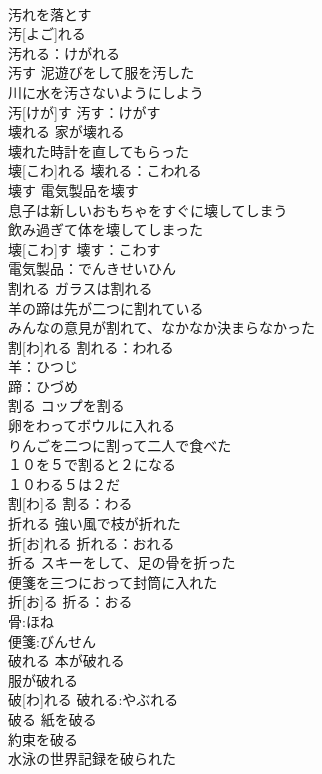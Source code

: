 \documentclass[8pt]{extreport}
\begin{document}
\begin{CJK}{UTF8}{min}
\\	汚れを落とす 
\\	汚[よご]れる		
\\	汚れる：けがれる
\\	汚す	泥遊びをして服を汚した 
\\	川に水を汚さないようにしよう 
\\	汚[けが]す			汚す：けがす
\\	壊れる	家が壊れる 
\\	壊れた時計を直してもらった 
\\	壊[こわ]れる			壊れる：こわれる
\\	壊す	電気製品を壊す 
\\	息子は新しいおもちゃをすぐに壊してしまう 
\\	飲み過ぎて体を壊してしまった 
\\	壊[こわ]す			壊す：こわす 
\\	電気製品：でんきせいひん
\\	割れる	ガラスは割れる 
\\	羊の蹄は先が二つに割れている 
\\	みんなの意見が割れて、なかなか決まらなかった 
\\	割[わ]れる			割れる：われる
\\	羊：ひつじ
\\	蹄：ひづめ
\\	割る	コップを割る 
\\	卵をわってボウルに入れる 
\\	りんごを二つに割って二人で食べた 
\\	１０を５で割ると２になる 
\\	１０わる５は２だ 
\\	割[わ]る			割る：わる
\\	折れる	強い風で枝が折れた 
\\	折[お]れる			折れる：おれる
\\	折る	スキーをして、足の骨を折った 
\\	便箋を三つにおって封筒に入れた 
\\	折[お]る			折る：おる
\\	骨:ほね
\\	便箋:びんせん
\\	破れる	本が破れる 
\\	服が破れる 
\\	破[わ]れる			破れる:やぶれる
\\	破る	紙を破る 
\\	約束を破る 
\\	水泳の世界記録を破られた 

\end{CJK}
\end{document}
